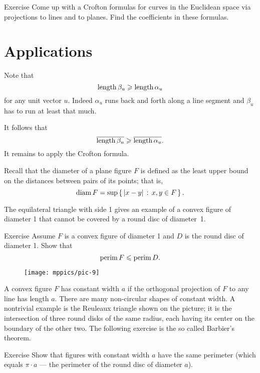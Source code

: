 \begin{thm}{Exercise}\label{ex:3d-crofton}
Come up with a Crofton formulas for curves in the Euclidean space via projections to lines and to planes.
Find the coefficients in these formulas.
\end{thm}

\section{Applications}

Note that 
\[\mathop{\rm length}\nolimits \beta_u\geqslant \mathop{\rm length}\nolimits \alpha_u\]
for any unit vector $u$.
Indeed $\alpha_u$ runs back and forth along a line segment and $\beta_u$ has to run at least that much.

It follows that 
\[\overline{\mathop{\rm length}\nolimits \beta_u}\geqslant \overline{\mathop{\rm length}\nolimits \alpha_u}.\]
It remains to apply the Crofton formula.
\qeds


Recall that the diameter of a plane figure $F$ is defined as the least upper bound on the distances between pairs of its points;
that is,
\[\mathop{\rm diam}\nolimits F=\sup\left\{\,{|x-y|}\,:\,{x,y\in F}\,\right\}.\]

The equilateral triangle with side 1 gives an example of a convex figure of diameter 1 that cannot be covered by a round disc of diameter~1.

\begin{thm}{Exercise} 
Assume $F$ is a convex figure of diameter 1 and $D$ is the round disc of diameter 1.
Show that
\[\mathop{\rm perim}\nolimits F\leqslant \mathop{\rm perim}\nolimits D.\]
\end{thm}

\begin{wrapfigure}{r}{33 mm}
\vskip-5mm
\centering
\texttt{[image: mppics/pic-9]}
\end{wrapfigure}

A convex figure $F$ has constant width $a$ if the orthogonal projection of $F$ to any line has length $a$.
There are many non-circular shapes of constant width. 
A nontrivial example is the Reuleaux triangle shown on the picture;
it is the intersection of three round disks of the same radius, each having its center on the boundary of the other two.
The following exercise is the so called Barbier's theorem.

\begin{thm}{Exercise} 
Show that figures with constant width $a$ have the same perimeter (which equals $\pi\cdot a$ --- the perimeter of the round disc of diameter $a$).
\end{thm}

